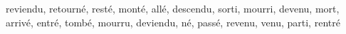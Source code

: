 reviendu, retourné, resté, monté, allé, descendu, sorti, mourri, devenu, mort, arrivé, entré, tombé, mourru, deviendu, né, passé, revenu, venu, parti, rentré
